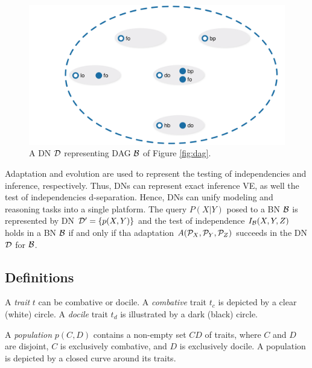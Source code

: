 \begin{figure}[hbt]
    \begin{center}
        \includegraphics[width=\textwidth]{img/DN_darwiche}
    \end{center}
    \caption{A DN ${\cal D}$ representing DAG ${\cal B}$ of Figure \ref{fig:dag}.}
    \label{fig:dn}
\end{figure}

Adaptation and evolution are used to represent the testing of independencies and inference, respectively.
Thus, DNs can represent exact inference VE, as well the test of independencies d-separation.
Hence, DNs can unify modeling and reasoning tasks into a single platform.
The query $P(X|Y)$ posed to a BN ${\cal B}$ is represented by DN ${\cal D}^{\prime} = \{ p(X,Y) \}$ and the test of independence $I_{\cal{B}}(X,Y,Z)$ holds in a BN $\cal{B}$ if and only if tha adaptation $A({\cal{P}}_X, {\cal{P}}_Y, {\cal{P}}_Z)$ succeeds in the DN $\cal{D}$ for $\cal{B}$.



\subsection{Definitions}
\label{subsec:definitions}



		A \emph{trait} $t$ can be combative or docile.
		A \emph{combative} trait $t_c$ is depicted by a clear (white) circle.
		A \emph{docile} trait $t_d$ is illustrated by a dark (black) circle.


		A \emph{population}  $p(C,D)$ contains a non-empty set $CD$ of traits, where $C$ and $D$ are disjoint, $C$ is exclusively combative, and $D$ is exclusively docile.
		A population is depicted by a closed curve around its traits.

